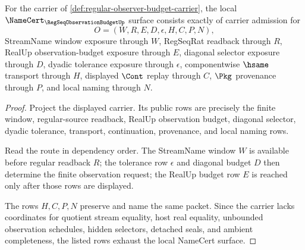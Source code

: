\begin{theorem}
\label{thm:regular-observer-budget-namecert-obligations}
For the carrier of \autoref{def:regular-observer-budget-carrier}, the local $\NameCert_{\RegSeqObservationBudgetUp}$ surface consists exactly of carrier admission for
$$
O=(W,R,E,D,\epsilon,H,C,P,N),
$$
StreamName window exposure through $W$, RegSeqRat readback through $R$, RealUp observation-budget exposure through $E$, diagonal selector exposure through $D$, dyadic tolerance exposure through $\epsilon$, componentwise $\hsame$ transport through $H$, displayed $\Cont$ replay through $C$, $\Pkg$ provenance through $P$, and local naming through $N$.
\end{theorem}
\begin{proof}
Project the displayed carrier. Its public rows are precisely the finite window, regular-source readback, RealUp observation budget, diagonal selector, dyadic tolerance, transport, continuation, provenance, and local naming rows.

Read the route in dependency order. The StreamName window $W$ is available before regular readback $R$; the tolerance row $\epsilon$ and diagonal budget $D$ then determine the finite observation request; the RealUp budget row $E$ is reached only after those rows are displayed.

The rows $H,C,P,N$ preserve and name the same packet. Since the carrier lacks coordinates for quotient stream equality, host real equality, unbounded observation schedules, hidden selectors, detached seals, and ambient completeness, the listed rows exhaust the local NameCert surface.
\end{proof}

